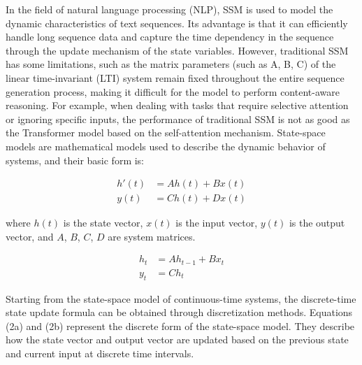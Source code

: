 \documentclass{article}
\theoremstyle{plain}
\theoremstyle{definition}
\theoremstyle{remark}
\begin{document}
In the field of natural language processing (NLP), SSM is used to model the dynamic characteristics of text sequences. Its advantage is that it can efficiently handle long sequence data and capture the time dependency in the sequence through the update mechanism of the state variables. However, traditional SSM has some limitations, such as the matrix parameters (such as A, B, C) of the linear time-invariant (LTI) system remain fixed throughout the entire sequence generation process, making it difficult for the model to perform content-aware reasoning. For example, when dealing with tasks that require selective attention or ignoring specific inputs, the performance of traditional SSM is not as good as the Transformer model based on the self-attention mechanism.
State-space models are mathematical models used to describe the dynamic behavior of systems, and their basic form is:

\begin{equation}
\begin{aligned}
   h'(t) &= Ah(t) + Bx(t) \\
   y(t) &= Ch(t) + Dx(t)
\end{aligned}
\end{equation}

where $h(t)$ is the state vector, $x(t)$ is the input vector, $y(t)$ is the output vector, and $A$, $B$, $C$, $D$ are system matrices.

\begin{equation}
\begin{aligned}
   h_t &= Ah_{t-1} + Bx_t \\
   y_t &= Ch_t
\end{aligned}
\label{eq:state_space}
\end{equation}

Starting from the state-space model of continuous-time systems, the discrete-time state update formula can be obtained through discretization methods. Equations (2a) and (2b) represent the discrete form of the state-space model. They describe how the state vector and output vector are updated based on the previous state and current input at discrete time intervals.
\end{document}
